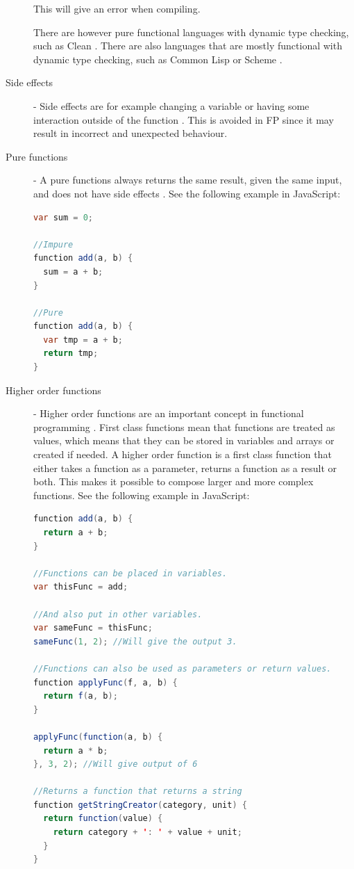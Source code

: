 \documentclass {article}
\begin{document}
\begin{description}
\item [] This will give an error when compiling.
\item[] There are however pure functional languages with dynamic type checking, such as Clean \cite{clean}. There are also languages that are mostly functional with dynamic type checking, such as Common Lisp \cite{commonLisp} or Scheme \cite{scheme} \cite{langTable}.
\item [Side effects] - Side effects are for example changing a variable or having some interaction outside of the function \cite{drboolean}. This is avoided in FP since it may result in incorrect and unexpected behaviour. 
\item [Pure functions] - A pure functions always returns the same result, given the same input, and does not have side effects \cite{drboolean}. See the following example in JavaScript: 
 
\begin{lstlisting}[language=Java]
var sum = 0;
 
//Impure
function add(a, b) {
  sum = a + b;
}
 
//Pure
function add(a, b) {
  var tmp = a + b;
  return tmp;
}
\end{lstlisting}
 
\item [Higher order functions] - Higher order functions are an important concept in functional programming \cite{fogus}. First class functions mean that functions are treated as values, which means that they can be stored in variables and arrays or created if needed. A higher order function is a first class function that either takes a function as a parameter, returns a function as a result or both. This makes it possible to compose larger and more complex functions. See the following example in JavaScript:
 
\begin{lstlisting}[language=Java, breaklines=true]
function add(a, b) {
  return a + b;
}
 
//Functions can be placed in variables.
var thisFunc = add;
 
//And also put in other variables.
var sameFunc = thisFunc;
sameFunc(1, 2); //Will give the output 3.
 
//Functions can also be used as parameters or return values.
function applyFunc(f, a, b) {
  return f(a, b);
}
 
applyFunc(function(a, b) {
  return a * b;
}, 3, 2); //Will give output of 6
 
//Returns a function that returns a string
function getStringCreator(category, unit) {
  return function(value) {
    return category + ': ' + value + unit;
  }
}
 

\end{lstlisting}
\end{description}
\end{document}

